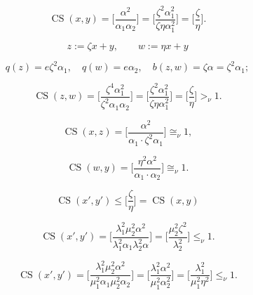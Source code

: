 \documentclass{article}
\begin{document}
\begin{equation}\label{eq:II.7.17}
{\operatorname{CS}}(x,y) = \bigg[ \frac{{\alpha}^2}{ {\alpha}_1 {\alpha}_2} \bigg]  = \bigg[ \frac{{\zeta}^ 2 {\alpha}_1^2 }{ {\zeta} \eta {\alpha}_1^2} \bigg] = \bigg[ \frac{\zeta}{ \eta} \bigg].
\end{equation}

\begin{equation}\label{eq:II.7.18}
z := {\zeta} x + y, \qquad w := \eta x + y
\end{equation}

$$q(z) = e {\zeta}^2 {\alpha}_1, \quad q(w) = e {\alpha}_2, \quad b(z,w) = {\zeta} {\alpha} = {\zeta}^2 {\alpha}_1;$$

\begin{equation}\label{eq:II.7.19}
{\operatorname{CS}}(z,w) = \bigg[ \frac{{\zeta}^4 {\alpha}_1^2}{ {\zeta}^2 {\alpha}_1 {\alpha}_2} \bigg]  = \bigg[ \frac{{\zeta}^ 2 {\alpha}_1^2 }{ {\zeta} \eta {\alpha}_1^2} \bigg] = \bigg[ \frac{\zeta}{ \eta} \bigg] {>_\nu} 1.
\end{equation}

\begin{equation}\label{eq:II.7.20}
{\operatorname{CS}}(x,z) = \bigg[ \frac{{\alpha}^2}{ {\alpha}_1 \cdot {\zeta}^2 {\alpha}_1} \bigg]  {\cong_\nu} 1,
\end{equation}

\begin{equation}\label{eq:II.7.21}
{\operatorname{CS}}(w,y) = \bigg[ \frac{\eta ^2 {\alpha}^2}{ {\alpha}_1 \cdot {\alpha}_2} \bigg]  {\cong_\nu} 1.
\end{equation}

\begin{equation}\label{eq:II.7.22}
{\operatorname{CS}}(x',y') \leq \bigg[ \frac{\zeta}{\eta} \bigg] = {\operatorname{CS}}(x,y)
\end{equation}

\begin{equation}\label{eq:II.7.23}
{\operatorname{CS}}(x',y') = \bigg[ \frac{{\lambda}_1 ^2  \mu_2 ^2 {\alpha}^2}{ {\lambda}_1^2 {\alpha}_1 {\lambda}_2^2 {\alpha} } \bigg]  =
\bigg[ \frac{ \mu_2 ^2 {\zeta} ^2}{{\lambda}_2^2 } \bigg] {\leq_\nu} 1.
\end{equation}

\begin{equation}\label{eq:II.7.24}
{\operatorname{CS}}(x',y') = \bigg[ \frac{{\lambda}_1 ^2  \mu_2 ^2 {\alpha}^2}{ \mu_1^2 {\alpha}_1 \mu_2^2 {\alpha}_2 } \bigg]  =
\bigg[ \frac{ {\lambda}_1 ^2 {\alpha} ^2}{\mu_1^2 {\alpha}_2^2 } \bigg] =
\bigg[ \frac{ {\lambda}_1 ^2 }{\mu_1^2 \eta^2 } \bigg] {\leq_\nu} 1.
\end{equation}
\end{document}
